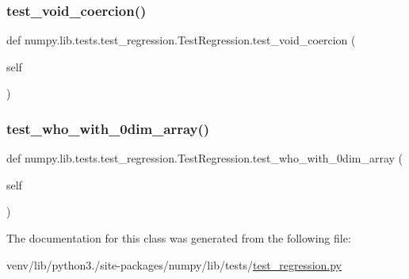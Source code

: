 \subsubsection{\texorpdfstring{test\+\_\+void\+\_\+coercion()}{test\_void\_coercion()}}
{\footnotesize\ttfamily def numpy.\+lib.\+tests.\+test\+\_\+regression.\+Test\+Regression.\+test\+\_\+void\+\_\+coercion (\begin{DoxyParamCaption}\item[{}]{self }\end{DoxyParamCaption})}

\mbox{\label{classnumpy_1_1lib_1_1tests_1_1test__regression_1_1TestRegression_a01701e041a9fbea92723825bad522d94}} 
\subsubsection{\texorpdfstring{test\+\_\+who\+\_\+with\+\_\+0dim\+\_\+array()}{test\_who\_with\_0dim\_array()}}
{\footnotesize\ttfamily def numpy.\+lib.\+tests.\+test\+\_\+regression.\+Test\+Regression.\+test\+\_\+who\+\_\+with\+\_\+0dim\+\_\+array (\begin{DoxyParamCaption}\item[{}]{self }\end{DoxyParamCaption})}



The documentation for this class was generated from the following file\+:\begin{DoxyCompactItemize}
\item 
venv/lib/python3./site-\/packages/numpy/lib/tests/\hyperlink{lib_2tests_2test__regression_8py}{test\+\_\+regression.\+py}\end{DoxyCompactItemize}

